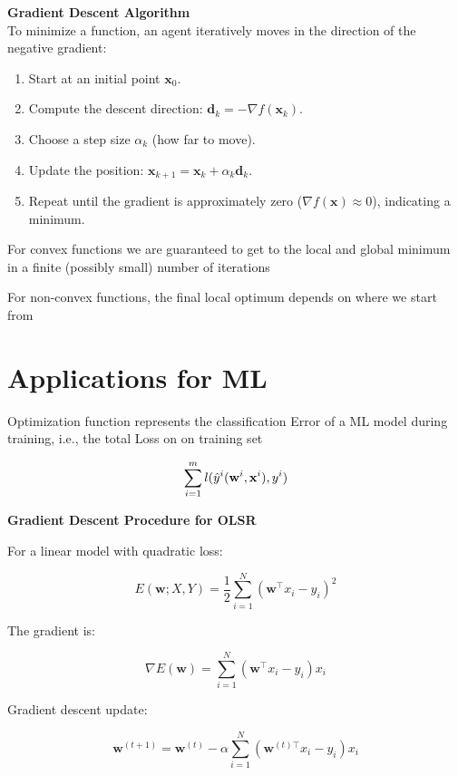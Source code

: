 \vspace{0.5em}
\textbf{Gradient Descent Algorithm}\\
To minimize a function, an agent iteratively moves in the direction of the negative gradient:

\begin{enumerate}
    \item Start at an initial point $\mathbf{x}_0$.
    \item Compute the descent direction: $\mathbf{d}_k = -\nabla f(\mathbf{x}_k)$.
    \item Choose a step size $\alpha_k$ (how far to move).
    \item Update the position: $\mathbf{x}_{k+1} = \mathbf{x}_k + \alpha_k \mathbf{d}_k$.
    \item Repeat until the gradient is approximately zero ($\nabla f(\mathbf{x}) \approx 0$), indicating a minimum.
\end{enumerate}

For convex functions we are guaranteed to get to the local and global minimum 
in a finite (possibly small) number of iterations

For non-convex functions, the final local optimum depends on where we start from

\section*{Applications for ML}

Optimization function represents the classification Error of a ML model during training,
i.e., the total Loss on on training set 

\[
\sum_{i=1}^{m}l(\hat{y}^i(\mathbf{w}^i, \mathbf{x}^i), y^i)
\]

\textbf{Gradient Descent Procedure for OLSR}

For a linear model with quadratic loss:

\[
E(\mathbf{w}; X, Y) = \frac{1}{2} \sum_{i=1}^N (\mathbf{w}^\top x_i - y_i)^2
\]

The gradient is:

\[
\nabla E(\mathbf{w}) = \sum_{i=1}^N (\mathbf{w}^\top x_i - y_i)x_i
\]

Gradient descent update:

\[
\mathbf{w}^{(t+1)} = \mathbf{w}^{(t)} - \alpha \sum_{i=1}^N (\mathbf{w}^{(t)\top} x_i - y_i)x_i
\]

